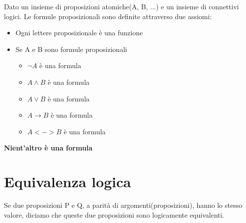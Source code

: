 \documentclass{article}
\begin{document}
Dato un insieme di proposizioni atomiche(A, B, ...) e un insieme di connettivi logici. Le formule proposizionali sono definite attraverso due assiomi:

\begin{itemize}
	\item Ogni lettere proposizionale è una funzione
	\item Se A e B sono formule proposizionali\begin{itemize}
		\item $ \neg A $ è una formula
		\item $ A \land B $ è una formula
		\item $ A \lor B $ è una formula
		\item $ A \rightarrow B $ è una formula
		\item $ A <-> B $ è una formula
	\end{itemize}
\end{itemize}

\textbf{Nient'altro è una formula}

\section{Equivalenza logica}

Se due proposizioni P e Q, a parità di argomenti(proposizioni), hanno lo stesso valore, diciamo che queste due proposizioni sono logicamente equivalenti.
\end{document}
